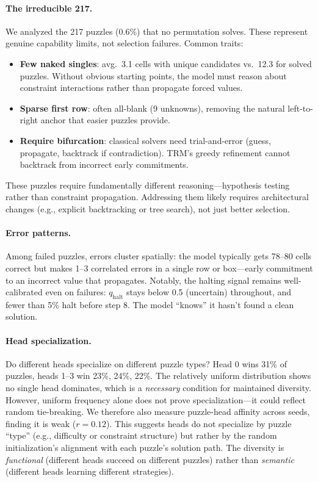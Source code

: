 \paragraph{The irreducible 217.} We analyzed the 217 puzzles (0.6\%) that no
permutation solves. These represent genuine capability limits, not selection
failures. Common traits:
%
\begin{itemize}
  \item \textbf{Few naked singles}: avg.\ 3.1 cells with unique candidates vs.\
    12.3 for solved puzzles. Without obvious starting points, the model must
    reason about constraint interactions rather than propagate forced values.
  \item \textbf{Sparse first row}: often all-blank (9 unknowns), removing the
    natural left-to-right anchor that easier puzzles provide.
  \item \textbf{Require bifurcation}: classical solvers need trial-and-error
    (guess, propagate, backtrack if contradiction). TRM's greedy refinement
    cannot backtrack from incorrect early commitments.
\end{itemize}
%
These puzzles require fundamentally different reasoning---hypothesis testing
rather than constraint propagation. Addressing them likely requires architectural
changes (e.g., explicit backtracking or tree search), not just better selection.

\paragraph{Error patterns.} Among failed puzzles, errors cluster spatially:
the model typically gets 78--80 cells correct but makes 1--3 correlated errors
in a single row or box---early commitment to an incorrect value that propagates.
Notably, the halting signal remains well-calibrated even on failures:
$q_\text{halt}$ stays below 0.5 (uncertain) throughout, and fewer than 5\% halt
before step 8. The model ``knows'' it hasn't found a clean solution.

\paragraph{Head specialization.}
Do different heads specialize on different puzzle types? Head 0 wins 31\% of
puzzles, heads 1--3 win 23\%, 24\%, 22\%. The relatively uniform distribution
shows no single head dominates, which is a \emph{necessary} condition for
maintained diversity. However, uniform frequency alone does not prove
specialization---it could reflect random tie-breaking. We therefore also measure
puzzle-head affinity across seeds, finding it is weak ($r = 0.12$). This
suggests heads do not specialize by puzzle ``type'' (e.g., difficulty or
constraint structure) but rather by the random initialization's alignment with
each puzzle's solution path. The diversity is \emph{functional} (different
heads succeed on different puzzles) rather than \emph{semantic} (different
heads learning different strategies).

